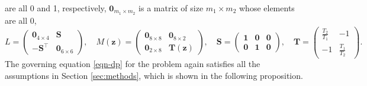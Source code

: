 \documentclass[openacc]{rsproca_new}%
\newcommand{\z}{\bm{z}}
\begin{document}
are all 0 and 1, respectively, 
$\bm{0}_{m_1 \times m_2}$
is a matrix of size $m_1\times m_2$
whose elements are all 0, 
\begin{equation} \label{def:LM-DP}
    L =\begin{pmatrix} 
    \bm{0}_{4\times 4}
    & \bm{S}
    \\
    -\bm{S}^\top & \bm{0}_{6\times 6}
    \end{pmatrix}, 
    \quad 
    M(\z) = \begin{pmatrix}
    \bm{0}_{8\times 8} &  \bm{0}_{8\times 2}
    \\
    \bm{0}_{2\times 8} & \bm{T}(\z)
    \end{pmatrix}, \quad 
    \bm{S} = \begin{pmatrix}
    \bm{1} & \bm{0} & \bm{0} \\
    \bm{0} & \bm{1} & \bm{0} 
    \end{pmatrix}, \quad 
    \bm{T} = \begin{pmatrix}
    \frac{T_2}{T_1} & -1 \\
     -1 & \frac{T_1}{T_2}
    \end{pmatrix}.
\end{equation}
The governing equation \eqref{eqn-dp} for the problem
again satisfies all the assumptions in Section \ref{sec:methods},
which is shown in the following proposition.
\end{document}
